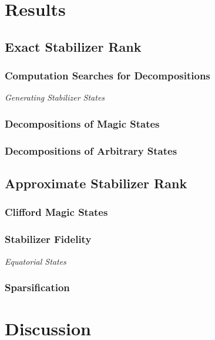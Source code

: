 \section{Results}
\subsection{Exact Stabilizer Rank}
\subsubsection*{Computation Searches for Decompositions}
\par
\large{\itshape{Generating Stabilizer States}}\par
\subsubsection*{Decompositions of Magic States}
\subsubsection*{Decompositions of Arbitrary States}
\subsection{Approximate Stabilizer Rank}
\subsubsection*{Clifford Magic States}
\subsubsection*{Stabilizer Fidelity}
\par
\large{\itshape{Equatorial States}}
\subsubsection*{Sparsification}
\section{Discussion}
